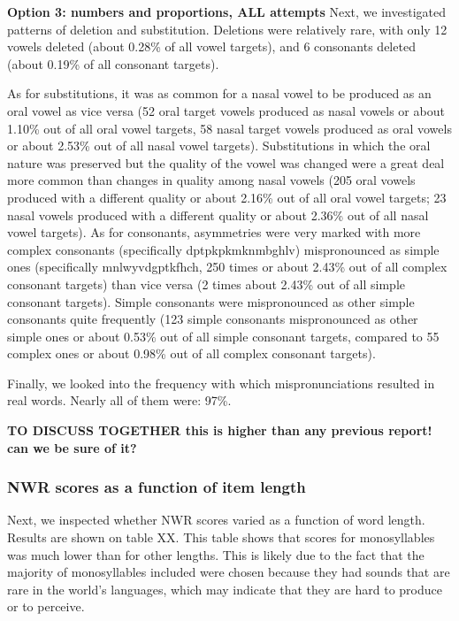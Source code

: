 \documentclass[english,,man,floatsintext]{apa6}
\begin{document}
\textbf{Option 3: numbers and proportions, ALL attempts}
Next, we investigated patterns of deletion and substitution. Deletions were relatively rare, with only 12 vowels deleted (about 0.28\% of all vowel targets), and 6 consonants deleted (about 0.19\% of all consonant targets).

As for substitutions, it was as common for a nasal vowel to be produced as an oral vowel as vice versa (52 oral target vowels produced as nasal vowels or about 1.10\% out of all oral vowel targets, 58 nasal target vowels produced as oral vowels or about 2.53\% out of all nasal vowel targets). Substitutions in which the oral nature was preserved but the quality of the vowel was changed were a great deal more common than changes in quality among nasal vowels (205 oral vowels produced with a different quality or about 2.16\% out of all oral vowel targets; 23 nasal vowels produced with a different quality or about 2.36\% out of all nasal vowel targets). As for consonants, asymmetries were very marked with more complex consonants (specifically dptpkpkmknmbghlv) mispronounced as simple ones (specifically mnlwyvdgptkfhch, 250 times or about 2.43\% out of all complex consonant targets) than vice versa (2 times about 2.43\% out of all simple consonant targets). Simple consonants were mispronounced as other simple consonants quite frequently (123 simple consonants mispronounced as other simple ones or about 0.53\% out of all simple consonant targets, compared to 55 complex ones or about 0.98\% out of all complex consonant targets).

Finally, we looked into the frequency with which mispronunciations resulted in real words. Nearly all of them were: 97\%.

\textbf{TO DISCUSS TOGETHER this is higher than any previous report! can we be sure of it?}

\hypertarget{nwr-scores-as-a-function-of-item-length}{%
\subsubsection{NWR scores as a function of item length}\label{nwr-scores-as-a-function-of-item-length}}

Next, we inspected whether NWR scores varied as a function of word length. Results are shown on table XX. This table shows that scores for monosyllables was much lower than for other lengths. This is likely due to the fact that the majority of monosyllables included were chosen because they had sounds that are rare in the world's languages, which may indicate that they are hard to produce or to perceive.
\end{document}

